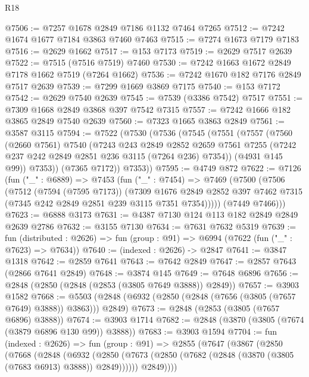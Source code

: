\begin{lexlean}{R18}
\begin{coremodule}
@7506 := @7257 @1678 @2849 @7186 @1132 @7464 @7265
@7512 := @7242 @1674 @1677 @7184 @3863 @7460 @7463
@7515 := @7274 @1673 @7179 @7183
@7516 := @2629 @1662
@7517 := @153 @7173
@7519 := @2629 @7517 @2639
@7522 := @7515 (@7516 @7519) @7460
@7530 := @7242 @1663 @1672 @2849 @7178 @1662 @7519 (@7264 @1662)
@7536 := @7242 @1670 @182 @7176 @2849 @7517 @2639
@7539 := @7299 @1669 @3869 @7175
@7540 := @153 @7172
@7542 := @2629 @7540 @2639
@7545 := @7539 (@3386 @7542) @7517
@7551 := @7309 @1668 @2849 @3868 @397 @7542 @7315
@7557 := @7242 @1666 @182 @3865 @2849 @7540 @2639
@7560 := @7323 @1665 @3863 @2849
@7561 := @3587 @3115
@7594 := @7522
    (@7530
      (@7536
        (@7545
          (@7551
            (@7557
              (@7560
                (@2660 @7561)
                @7540
                (@7243
                  @243
                  @2849
                  @2852
                  @2659
                  @7561
                  @7255
                  (@7242 @237 @242 @2849 @2851 @236 @3115 (@7264 @236) @7354))
                (@4931 @145 @99))
              @7353))
          (@7365 @7172))
        @7353))
@7595 := @4749 @872
@7622 := @7126
    (fun ("_" : @6889) =>
    @7453
      (fun ("_" : @7454) =>
      @7469
        (@7500
          (@7506
            (@7512
              (@7594 (@7595 @7173))
              (@7309
                @1676
                @2849
                @2852
                @397
                @7462
                @7315
                (@7345 @242 @2849 @2851 @239 @3115 @7351 @7354)))))
        (@7449 @7466)))
@7623 := @6888 @3173
@7631 := @4387 @7130 @124 @113 @182 @2849 @2849 @2639 @2786
@7632 := @3155 @7130
@7634 := @7631 @7632 @5319
@7639 := fun (distributed : @2626) =>
  fun (group : @91) => @6994 (@7622 (fun ("_" : @7623) => @7634))
@7640 := (indexed : @2626) -> @2847
@7641 := @3847 @1318
@7642 := @2859 @7641
@7643 := @7642 @2849
@7647 := @2857 @7643 (@2866 @7641 @2849)
@7648 := @3874 @145
@7649 := @7648 @6896
@7656 := @2848 (@2850 (@2848 (@2853 (@3805 @7649 @3888)) @2849))
@7657 := @3903 @1582
@7668 := @5503 (@2848 (@6932 (@2850 (@2848 (@7656 (@3805 (@7657 @7649) @3888)) @3863))) @2849)
@7673 := @2848 (@2853 (@3805 (@7657 @6896) @3888))
@7674 := @3903 @1714
@7682 := @2848 (@3870 (@3805 (@7674 (@3879 @6896 @130 @99)) @3888))
@7683 := @3903 @1594
@7704 := fun (indexed : @2626) =>
  fun (group : @91) =>
  @2855
    (@7647
      (@3867
        (@2850
          (@7668
            (@2848
              (@6932
                (@2850 (@7673 (@2850 (@7682 (@2848 (@3870 (@3805 (@7683 @6913) @3888)) @2849))))))
              @2849))))

\end{coremodule}
\end{lexlean}
